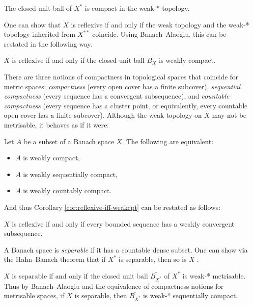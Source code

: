 \cite[Theorem IV.21]{RS80}
\begin{thm}
  The closed unit ball of $X^*$ is compact in the weak-* topology.
\end{thm}

One can show that $X$ is reflexive if and only if the weak topology and the weak-* topology inherited from $X^{**}$ coincide.
Using Banach--Alaoglu, this can be restated in the following way.

\begin{cor}\label{cor:reflexive-iff-weakcpt}
  $X$ is reflexive if and only if the closed unit ball $B_{X}$ is weakly compact.
\end{cor}


There are three notions of compactness in topological spaces that coincide for metric spaces: \emph{compactness} (every open cover has a finite subcover), \emph{sequential compactness} (every sequence has a convergent subsequence), and \emph{countable compactness} (every sequence has a cluster point, or equivalently, every countable open cover has a finite subcover).
Although the weak topology on $X$ may not be metrisable, it behaves as if it were:

\begin{thm}\label{thm:eberlein-smulian}
  Let $A$ be a subset of a Banach space $X$.
  The following are equivalent:
  \begin{itemize}
  \item $A$ is weakly compact,
  \item $A$ is weakly sequentially compact,
  \item $A$ is weakly countably compact.
  \end{itemize}
\end{thm}

And thus Corollary \ref{cor:reflexive-iff-weakcpt} can be restated as follows:

\begin{cor}\label{cor:reflexive-bdd-subsequence}
  $X$ is reflexive if and only if every bounded sequence has a weakly convergent subsequence.
\end{cor}

A Banach space is \emph{separable} if it has a countable dense subset.
One can show via the Hahn--Banach theorem that if $X^*$ is separable, then so is $X$ \cite[Theorem III.7]{RS80}.

\begin{thm}\label{thm:sep-met-dual}
  $X$ is separable if and only if the closed unit ball $\overline{B_{X^*}}$ of $X^*$ is weak-* metrisable.
  Thus by Banach--Alaoglu and the equivalence of compactness notions for metrisable spaces, if $X$ is separable, then $\overline{B_{X^*}}$ is weak-* sequentially compact.
\end{thm}



